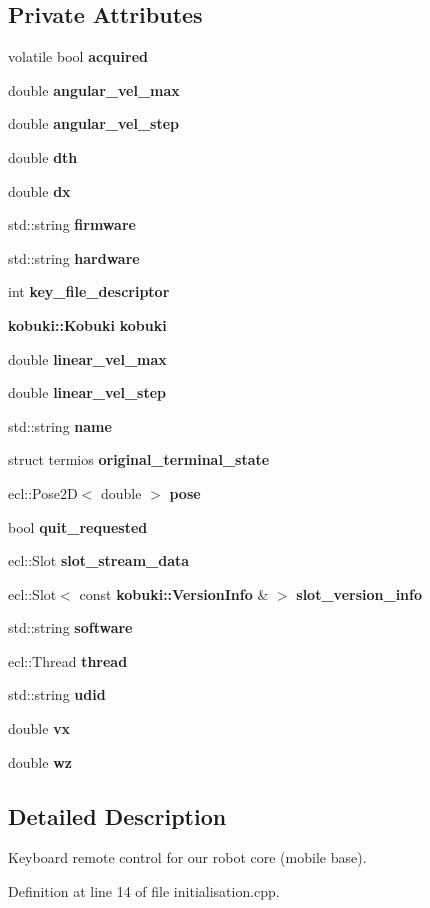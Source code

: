 \subsection*{\-Private \-Attributes}
\begin{DoxyCompactItemize}
\item 
volatile bool {\bf acquired}
\item 
double {\bf angular\-\_\-vel\-\_\-max}
\item 
double {\bf angular\-\_\-vel\-\_\-step}
\item 
double {\bf dth}
\item 
double {\bf dx}
\item 
std\-::string {\bf firmware}
\item 
std\-::string {\bf hardware}
\item 
int {\bf key\-\_\-file\-\_\-descriptor}
\item 
{\bf kobuki\-::\-Kobuki} {\bf kobuki}
\item 
double {\bf linear\-\_\-vel\-\_\-max}
\item 
double {\bf linear\-\_\-vel\-\_\-step}
\item 
std\-::string {\bf name}
\item 
struct termios {\bf original\-\_\-terminal\-\_\-state}
\item 
ecl\-::\-Pose2\-D$<$ double $>$ {\bf pose}
\item 
bool {\bf quit\-\_\-requested}
\item 
ecl\-::\-Slot {\bf slot\-\_\-stream\-\_\-data}
\item 
ecl\-::\-Slot$<$ const \*
{\bf kobuki\-::\-Version\-Info} \& $>$ {\bf slot\-\_\-version\-\_\-info}
\item 
std\-::string {\bf software}
\item 
ecl\-::\-Thread {\bf thread}
\item 
std\-::string {\bf udid}
\item 
double {\bf vx}
\item 
double {\bf wz}
\end{DoxyCompactItemize}


\subsection{\-Detailed \-Description}
\-Keyboard remote control for our robot core (mobile base). 

\-Definition at line 14 of file initialisation.\-cpp.



